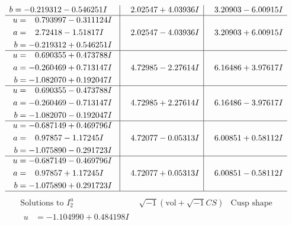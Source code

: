 \documentclass[1p]{elsarticle_modified}
\theoremstyle{definition}
\newcommand{\I}{\sqrt{-1}}
\begin{document}
$$\begin{array}{c|c|c}
\begin{aligned}
b &= -0.219312 - 0.546251 I\end{aligned}
 & \phantom{-}2.02547 + 4.03936 I & \phantom{-}3.20903 - 6.00915 I \\ \hline\begin{aligned}
u &= \phantom{-}0.793997 - 0.311124 I \\
a &= \phantom{-}2.72418 - 1.51817 I \\
b &= -0.219312 + 0.546251 I\end{aligned}
 & \phantom{-}2.02547 - 4.03936 I & \phantom{-}3.20903 + 6.00915 I \\ \hline\begin{aligned}
u &= \phantom{-}0.690355 + 0.473788 I \\
a &= -0.260469 + 0.713147 I \\
b &= -1.082070 + 0.192047 I\end{aligned}
 & \phantom{-}4.72985 - 2.27614 I & \phantom{-}6.16486 + 3.97617 I \\ \hline\begin{aligned}
u &= \phantom{-}0.690355 - 0.473788 I \\
a &= -0.260469 - 0.713147 I \\
b &= -1.082070 - 0.192047 I\end{aligned}
 & \phantom{-}4.72985 + 2.27614 I & \phantom{-}6.16486 - 3.97617 I \\ \hline\begin{aligned}
u &= -0.687149 + 0.469796 I \\
a &= \phantom{-}0.97857 - 1.17245 I \\
b &= -1.075890 - 0.291723 I\end{aligned}
 & \phantom{-}4.72077 - 0.05313 I & \phantom{-}6.00851 + 0.58112 I \\ \hline\begin{aligned}
u &= -0.687149 - 0.469796 I \\
a &= \phantom{-}0.97857 + 1.17245 I \\
b &= -1.075890 + 0.291723 I\end{aligned}
 & \phantom{-}4.72077 + 0.05313 I & \phantom{-}6.00851 - 0.58112 I\\
 \hline 
 \end{array}$$\newpage$$\begin{array}{c|c|c}  
\text{Solutions to }I^u_{2}& \I (\text{vol} + \sqrt{-1}CS) & \text{Cusp shape}\\
 \hline 
\begin{aligned}
u &= -1.104990 + 0.484198 I \\

\end{aligned}
\end{array}$$
\end{document}
